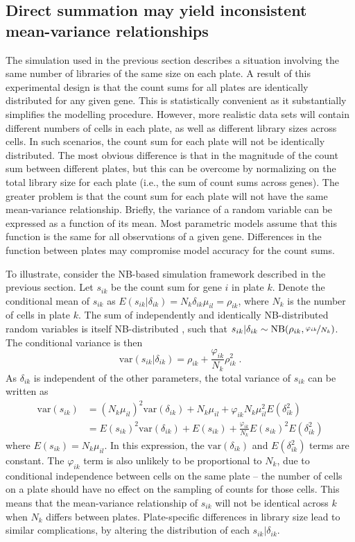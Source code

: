 \documentclass{article}
\begin{document}
\subsection{Direct summation may yield inconsistent mean-variance relationships}
The simulation used in the previous section describes a situation involving the same number of libraries of the same size on each plate.
A result of this experimental design is that the count sums for all plates are identically distributed for any given gene.
This is statistically convenient as it substantially simplifies the modelling procedure.
However, more realistic data sets will contain different numbers of cells in each plate, as well as different library sizes across cells.
In such scenarios, the count sum for each plate will not be identically distributed.
The most obvious difference is that in the magnitude of the count sum between different plates, 
    but this can be overcome by normalizing on the total library size for each plate (i.e., the sum of count sums across genes).
The greater problem is that the count sum for each plate will not have the same mean-variance relationship.
Briefly, the variance of a random variable can be expressed as a function of its mean.
Most parametric models assume that this function is the same for all observations of a given gene.
Differences in the function between plates may compromise model accuracy for the count sums.

To illustrate, consider the NB-based simulation framework described in the previous section.
Let $s_{ik}$ be the count sum for gene $i$ in plate $k$.
Denote the conditional mean of $s_{ik}$ as $E(s_{ik}|\delta_{ik})=N_k \delta_{ik}\mu_{il} = \rho_{ik}$, where $N_k$ is the number of cells in plate $k$.
The sum of independently and identically NB-distributed random variables is itself NB-distributed \cite{robinson2008small}, 
    such that $s_{ik} |\delta_{ik} \sim \mbox{NB}(\rho_{ik}, \nicefrac{\varphi_{ik}}{N_k})$.
The conditional variance is then
\[
    \mbox{var}(s_{ik} |\delta_{ik}) = \rho_{ik} + \frac{\varphi_{ik}}{N_k}\rho_{ik}^2 \;.
\]
As $\delta_{ik}$ is independent of the other parameters, the total variance of $s_{ik}$ can be written as
\begin{align*}
    \mbox{var}(s_{ik}) &= (N_k\mu_{il})^2\mbox{var}(\delta_{ik}) + N_k\mu_{il} + \varphi_{ik} N_k\mu_{il}^2 E(\delta_{ik}^2) \\
                       &= E(s_{ik})^2 \mbox{var}(\delta_{ik}) + E(s_{ik}) + \frac{\varphi_{ik}}{N_k} E(s_{ik})^2 E(\delta_{ik}^2) 
\end{align*}
where $E(s_{ik})=N_k\mu_{il}$. 
In this expression, the $\mbox{var}(\delta_{ik})$ and $E(\delta_{ik}^2)$ terms are constant.
The $\varphi_{ik}$ term is also unlikely to be proportional to $N_k$, due to conditional independence between cells on the same plate 
    -- the number of cells on a plate should have no effect on the sampling of counts for those cells.
This means that the mean-variance relationship of $s_{ik}$ will not be identical across $k$ when $N_k$ differs between plates.
Plate-specific differences in library size lead to similar complications, by altering the distribution of each $s_{ik} |\delta_{ik}$.
\end{document}
